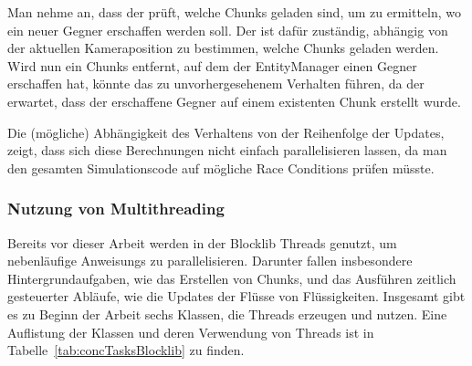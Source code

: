 Man nehme an, dass der  prüft, welche Chunks geladen sind, um zu ermitteln, wo ein neuer Gegner erschaffen werden soll. Der  ist dafür zuständig, abhängig von der aktuellen Kameraposition zu bestimmen, welche Chunks geladen werden. Wird nun ein Chunks entfernt, auf dem der EntityManager einen Gegner erschaffen hat, könnte das zu unvorhergesehenem Verhalten führen, da der  erwartet, dass der erschaffene Gegner auf einem existenten Chunk erstellt wurde.

Die (mögliche) Abhängigkeit des Verhaltens von der Reihenfolge der Updates, zeigt, dass sich diese Berechnungen nicht einfach parallelisieren lassen, da man den gesamten Simulationscode auf mögliche Race Conditions prüfen müsste.


\subsubsection{Nutzung von Multithreading}\label{sec:nutzungMultithreading}
Bereits vor dieser Arbeit werden in der Blocklib Threads genutzt, um nebenläufige \glspl{Anweisung} zu parallelisieren. Darunter fallen insbesondere Hintergrundaufgaben, wie das Erstellen von Chunks, und das Ausführen zeitlich gesteuerter Abläufe, wie die Updates der Flüsse von Flüssigkeiten. Insgesamt gibt es zu Beginn der Arbeit sechs Klassen, die Threads erzeugen und nutzen. Eine Auflistung der Klassen und deren Verwendung von Threads ist in Tabelle~\ref{tab:concTasksBlocklib} zu finden.

